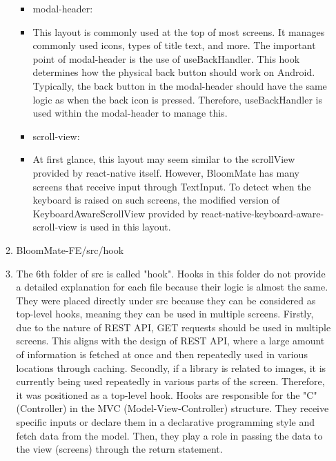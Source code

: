 \documentclass[conference, a4paper]{IEEEtran}
\begin{document}
\begin{enumerate}
\begin{enumerate}
\begin{itemize}
        \item modal-header: 
        \item[] This layout is commonly used at the top of most screens. It manages commonly used icons, types of title text, and more. The important point of modal-header is the use of useBackHandler. This hook determines how the physical back button should work on Android. Typically, the back button in the modal-header should have the same logic as when the back icon is pressed. Therefore, useBackHandler is used within the modal-header to manage this. \\

        \item scroll-view: 
        \item[] At first glance, this layout may seem similar to the scrollView provided by react-native itself. However, BloomMate has many screens that receive input through TextInput. To detect when the keyboard is raised on such screens, the modified version of KeyboardAwareScrollView provided by react-native-keyboard-aware-scroll-view is used in this layout.
    \end{itemize}

    \item BloomMate-FE/src/hook
    \item[] The 6th folder of src is called "hook". Hooks in this folder do not provide a detailed explanation for each file because their logic is almost the same. They were placed directly under src because they can be considered as top-level hooks, meaning they can be used in multiple screens. Firstly, due to the nature of REST API, GET requests should be used in multiple screens. This aligns with the design of REST API, where a large amount of information is fetched at once and then repeatedly used in various locations through caching. Secondly, if a library is related to images, it is currently being used repeatedly in various parts of the screen. Therefore, it was positioned as a top-level hook. Hooks are responsible for the "C" (Controller) in the MVC (Model-View-Controller) structure. They receive specific inputs or declare them in a declarative programming style and fetch data from the model. Then, they play a role in passing the data to the view (screens) through the return statement.
    \end{enumerate}
\end{enumerate}
\end{document}
